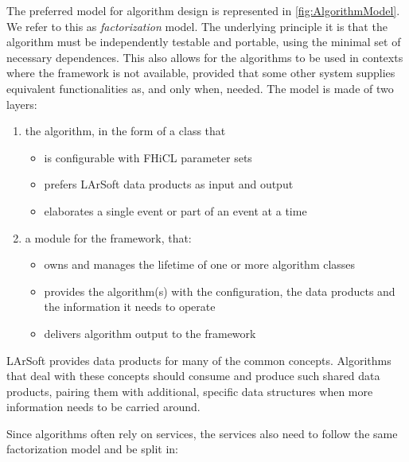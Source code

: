 The preferred model for algorithm design is represented in \cref{fig:AlgorithmModel}.
We refer to this as \emph{factorization} model.
The underlying principle it is that the algorithm must be independently
testable and portable, using the minimal set of necessary dependences.
This also allows for the algorithms to be used in contexts where the
\ART framework is not available,
provided that some other system supplies equivalent functionalities as,
and only when, needed. The model is made of two layers:
\begin{enumerate}
   \item
      the algorithm, in the form of a class that
      \begin{itemize}
         \item
            is configurable with FHiCL parameter sets
         \item
            prefers LArSoft data products as input and output
         \item
            elaborates a single event or part of an event at a time
      \end{itemize}
   \item
      a module for the \ART framework, that:
      \begin{itemize}
         \item \label{response:0202.1}
           owns and manages the lifetime of one or more algorithm classes
         \item
           provides the algorithm(s) with the configuration, the data products
           and the information it needs to operate
         \item
           delivers algorithm output to the \ART framework
      \end{itemize}
\end{enumerate}
\label{response:0203.1}
LArSoft provides data products for many of the common concepts.
Algorithms that deal with these concepts should consume and produce such shared data products,
pairing them with additional, specific data structures
when more information needs to be carried around.

Since algorithms often rely on services, the services also need to
follow the same factorization model and be split in:

